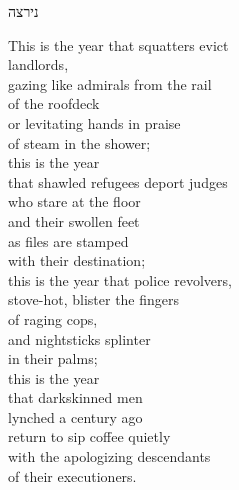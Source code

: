 \documentclass[a4paper,10pt,openany]{memoir}
\newcommand{\hchapter}[1]{
  \begin{hebrew}
    \begin{Spacing}{.97}
      \newpage
      \strut

      \vspace{.15em}

      \noindent\Huge #1

      \vspace{1em}
    \end{Spacing}
  \end{hebrew}
}
\begin{document}
\vfill

\hchapter{נירצה}

\begin{multicols}{2}
\noindent
\small
This is the year that squatters evict \\
\vin landlords, \\
gazing like admirals from the rail \\
of the roofdeck \\
or levitating hands in praise \\
of steam in the shower; \\
this is the year \\
that shawled refugees deport judges \\
who stare at the floor \\
and their swollen feet \\
as files are stamped \\
with their destination; \\
this is the year that police revolvers, \\
stove-hot, blister the fingers \\
of raging cops, \\
and nightsticks splinter \\
in their palms; \\
this is the year \\
that darkskinned men \\
lynched a century ago \\
return to sip coffee quietly \\
with the apologizing descendants \\
of their executioners. \\
 

\end{multicols}
\end{document}
